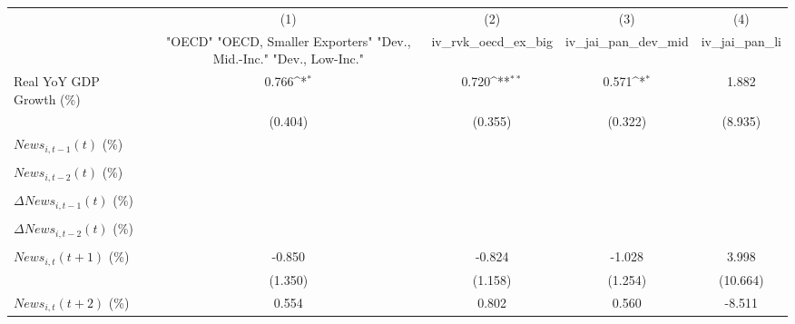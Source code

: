 {
\def\sym#1{\ifmmode^{#1}\else\(^{#1}\)\fi}
\begin{tabular}{l*{4}{c}}
\toprule
                    &\multicolumn{1}{c}{(1)}&\multicolumn{1}{c}{(2)}&\multicolumn{1}{c}{(3)}&\multicolumn{1}{c}{(4)}\\
                    &\multicolumn{1}{c}{ "OECD" "OECD, Smaller Exporters" "Dev., Mid.-Inc." "Dev., Low-Inc."}&\multicolumn{1}{c}{iv_rvk_oecd_ex_big}&\multicolumn{1}{c}{iv_jai_pan_dev_mid}&\multicolumn{1}{c}{iv_jai_pan_li}\\
\midrule
Real YoY GDP Growth (\%)&       0.766\sym{*}  &       0.720\sym{**} &       0.571\sym{*}  &       1.882         \\
                    &     (0.404)         &     (0.355)         &     (0.322)         &     (8.935)         \\
\addlinespace
$ News_{i,t-1}(t)$ (\%)&                     &                     &                     &                     \\
                    &                     &                     &                     &                     \\
\addlinespace
$ News_{i,t-2}(t)$ (\%)&                     &                     &                     &                     \\
                    &                     &                     &                     &                     \\
\addlinespace
$ \Delta News_{i,t-1}(t)$ (\%)&                     &                     &                     &                     \\
                    &                     &                     &                     &                     \\
\addlinespace
$ \Delta News_{i,t-2}(t)$ (\%)&                     &                     &                     &                     \\
                    &                     &                     &                     &                     \\
\addlinespace
$ News_{i,t}(t+1)$ (\%)&      -0.850         &      -0.824         &      -1.028         &       3.998         \\
                    &     (1.350)         &     (1.158)         &     (1.254)         &    (10.664)         \\
\addlinespace
$ News_{i,t}(t+2)$ (\%)&       0.554         &       0.802         &       0.560         &      -8.511         \\

\end{tabular}}
